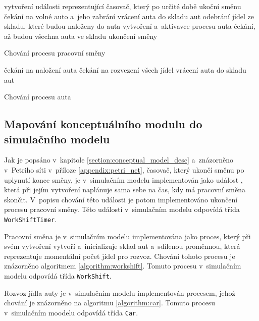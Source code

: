 \documentclass[a4paper, 11pt]{article}
\begin{document}
	\begin{algorithm}[ht]

		vytvoření události reprezentující časovač, který po určité době
		ukoční směnu\;
		{
			čekání na volné auto a~jeho zabrání\;
			{
				vrácení auta do skladu aut\;
				\Break\;
			}
			{
				odebrání jídel ze skladu, které budou naloženy do auta\;
				vytvoření a~aktivavce procesu auta\;
			}
		}
		čekání, až budou všechna auta ve skladu\;
		ukončení směny\;

		\caption{Chování procesu pracovní směny}
		\label{algorithm:workshift}
	\end{algorithm}

	\begin{algorithm}[ht]
		čekání na naložení auta\;
		čekání na rozvezení všech jídel\;
		vrácení auta do skladu aut\;

		\caption{Chování procesu auta}
		\label{algorithm:car}
	\end{algorithm}


	\subsection{Mapování konceptuálního modulu do simulačního modelu}

	Jak je popsáno v~kapitole \ref{section:conceptual_model_desc}
	a~znázorněno v~Petriho síti v~příloze \ref{appendix:petri_net}, časovač,
	který ukončí směnu po uplynutí konce směny, je v~simulačním modelu
	implementován jako událost \cite[snímek 169]{IMS_slides}, která
	při jejím vytvoření naplánuje sama sebe na čas, kdy má pracovní směna
	skončit. V~popisu chování této události je potom implementováno
	ukončení procesu pracovní směny. Této události v~simulačním modelu
	odpovídá třída \texttt{WorkShiftTimer}.

	Pracovní směna je v~simulačním modelu implementována jako proces, který
	při svém vytvoření vytvoří a~inicializuje sklad
	\cite[snímek 184]{IMS_slides} aut a~sdílenou proměnnou, která reprezentuje
	momentální počet jídel pro rozvoz. Chování tohoto procesu
	je znázorněno algoritmem \ref{algorithm:workshift}. Tomuto procesu
	v~simulačním modelu odpovídá třída \texttt{WorkShift}.

	Rozvoz jídla auty je v~simulačním modelu implementován procesem, jehož
	chování je znázorněno na algoritmu \ref{algorithm:car}. Tomuto procesu
	v~simulačním moodelu odpovídá třída \texttt{Car}.
\end{document}
